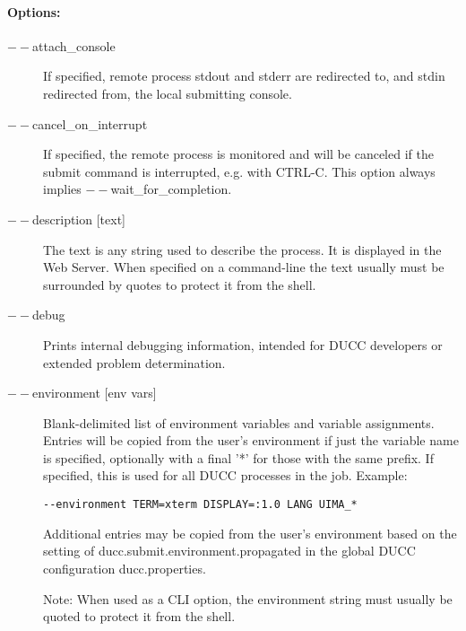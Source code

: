     \paragraph{Options:}
    \begin{description}
    
        \item[$--$attach\_console] If specified, remote process stdout and stderr are 
          redirected to, and stdin redirected from, the local submitting console.
          
        \item[$--$cancel\_on\_interrupt] If specified, the remote process is monitored 
           and will be canceled if the submit command is interrupted, e.g. with CTRL-C. 
           This option always implies $--$wait\_for\_completion.
        
        \item[$--$description {[text]}] The text is any string used to describe the process. It is
          displayed in the Web Server. When specified on a command-line the text usually must be
          surrounded by quotes to protect it from the shell.

        \item[$--$debug ] Prints internal debugging information, intended for DUCC developers or
          extended problem determination.

        \item[$--$environment {[env vars]}] Blank-delimited list of environment variables and variable
          assignments. 
          Entries will be copied from the user's environment if just the variable name is
          specified, optionally with a final '*' for those with the same prefix.
          If specified, this is used for all DUCC processes in the job. Example:
\begin{verbatim}
--environment TERM=xterm DISPLAY=:1.0 LANG UIMA_*
\end{verbatim}

          \begin{sloppypar}
            Additional entries may be copied from the user's environment based on the setting of
            ducc.submit.environment.propagated in the global DUCC configuration ducc.properties.
          \end{sloppypar}

          Note: When used as a CLI option, the environment string must usually be
          quoted to protect it from the shell.


\end{description}
